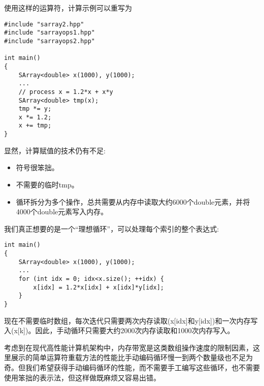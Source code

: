 使用这样的运算符，计算示例可以重写为

\begin{lstlisting}[style=styleCXX]
#include "sarray2.hpp"
#include "sarrayops1.hpp"
#include "sarrayops2.hpp"

int main()
{
	SArray<double> x(1000), y(1000);
	...
	// process x = 1.2*x + x*y
	SArray<double> tmp(x);
	tmp *= y;
	x *= 1.2;
	x += tmp;
}
\end{lstlisting}

显然，计算赋值的技术仍有不足:

\begin{itemize}
\item 
符号很笨拙。

\item 
不需要的临时tmp。

\item 
循环拆分为多个操作，总共需要从内存中读取大约6000个double元素，并将4000个double元素写入内存。
\end{itemize}

我们真正想要的是一个“理想循环”，可以处理每个索引的整个表达式:

\begin{lstlisting}[style=styleCXX]
int main()
{
	SArray<double> x(1000), y(1000);
	...
	for (int idx = 0; idx<x.size(); ++idx) {
		x[idx] = 1.2*x[idx] + x[idx]*y[idx];
	}
}
\end{lstlisting}

现在不需要临时数组，每次迭代只需要两次内存读取(x[idx]和y[idx])和一次内存写入(x[k])。因此，手动循环只需要大约2000次内存读取和1000次内存写入。

考虑到在现代高性能计算机架构中，内存带宽是这类数组操作速度的限制因素，这里展示的简单运算符重载方法的性能比手动编码循环慢一到两个数量级也不足为奇。但我们希望获得手动编码循环的性能，而不需要手工编写这些循环，也不需要使用笨拙的表示法，但这样做既麻烦又容易出错。















